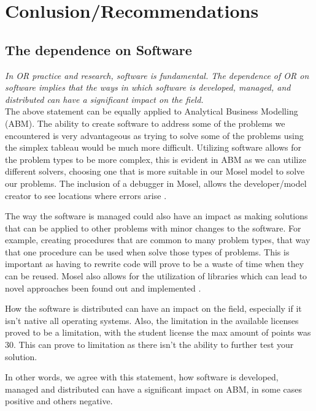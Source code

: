 \documentclass[a4paper,11pt]{article}
\begin{document}
\section{Conlusion/Recommendations}

\subsection*{The dependence on Software}
\textit{ In OR practice and research, software is fundamental. The dependence
of OR on software implies that the ways in which software is developed, managed, and distributed can
have a significant impact on the field.}\\

The above statement can be equally applied to Analytical Business Modelling (ABM). The ability to create software to address some of the problems we encountered is very advantageous as trying to solve some of the problems using the simplex tableau would be much more difficult. Utilizing software allows for the problem types to be more complex, this is evident in ABM as we can utilize different solvers, choosing one that is more suitable in our Mosel model to solve our problems. The inclusion of a debugger in Mosel, allows the developer/model creator to see locations where errors arise \cite{colombani2002mosel}.

The way the software is managed could also have an impact as making solutions that can be applied to other problems with minor changes to the software. For example, creating procedures that are common to many problem types, that way that one procedure can be used when solve those types of problems. This is important as having to rewrite code will prove to be a waste of time when they can be reused. Mosel also allows for the utilization of libraries which can lead to novel approaches been found out and implemented \cite{colombani2002mosel}.

How the software is distributed can have an impact on the field, especially if it isn't native all operating systems. Also, the limitation in the available licenses proved to be a limitation, with the student license the max amount of points was 30. This can prove to limitation as there isn't the ability to further test your solution.

In other words, we agree with this statement, how software is developed, managed and distributed can have a significant impact on ABM, in some cases positive and others negative. 
\end{document}
